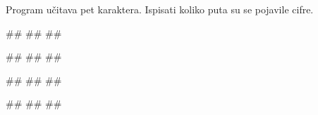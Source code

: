 \begin{Exercise}[label=p1.7_] 
Program učitava pet karaktera. Ispisati koliko
puta su se pojavile cifre. 

\begin{miditest}
\begin{upotreba}{1}
#\naslovInt#
##
##
\end{upotreba}
\end{miditest}
\begin{miditest}
\begin{upotreba}{2}
#\naslovInt#
##
##
\end{upotreba}
\end{miditest}

\begin{miditest}
\begin{upotreba}{3}
#\naslovInt#
##
##
\end{upotreba}
\end{miditest}
\begin{miditest}
\begin{upotreba}{4}
#\naslovInt#
##
##
\end{upotreba}
\end{miditest}
\end{Exercise}
\ifresenja
 \begin{Answer}[ref=p1.7_]
\end{Answer}
\fi





